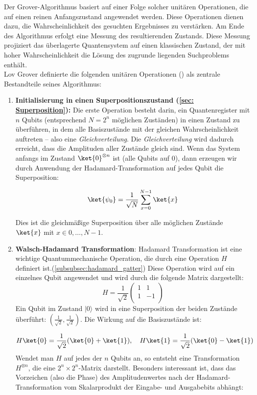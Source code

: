 {Der Grover-Algorithmus basiert auf einer Folge solcher unitären Operationen, die auf einen reinen Anfangszustand angewendet werden. Diese Operationen dienen dazu, die Wahrscheinlichkeit des gesuchten Ergebnisses zu verstärken. Am Ende des Algorithmus erfolgt eine Messung des resultierenden Zustands. Diese Messung projiziert das überlagerte Quantensystem auf einen klassischen Zustand, der mit hoher Wahrscheinlichkeit die Lösung des zugrunde liegenden Suchproblems enthält.\\

Lov Grover definierte die folgenden unitären Operationen (\cite{zotero-1211}) als zentrale Bestandteile seines Algorithmus:

\begin{enumerate}
    \item \textbf{Initialisierung in einen Superpositionszustand (\ref{sec: Superposition}):} 
    Die erste Operation besteht darin, ein Quantenregister mit $n$ Qubits (entsprechend $N = 2^{n}$ möglichen Zuständen) in einen Zustand zu überführen, in dem alle Basiszustände mit der gleichen Wahrscheinlichkeit auftreten – also eine \textit{Gleichverteilung}. Die \textit{Gleichverteilung} wird dadurch erreicht, dass die Amplituden aller Zustände gleich sind. Wenn das System anfangs im Zustand $\ket{0}^{\otimes n}$ ist (alle Qubits auf 0), dann erzeugen wir durch Anwendung der Hadamard-Transformation auf jedes Qubit die Superposition:

$$
\ket{\psi_0} = \frac{1}{\sqrt{N}} \sum_{x=0}^{N-1} \ket{x}
$$

Dies ist die gleichmäßige Superposition über alle möglichen Zustände $\ket{x}$ mit $x \in {0, \ldots, N-1}$.\\
    \item \textbf{Walsch-Hadamard Transformation}: Hadamard Transformation ist eine wichtige Quantummechanische Operation, die durch eine Operation $H$ definiert ist.(\ref{subsubsec:hadamard_gatter}) Diese Operation wird auf ein einzelnes Qubit angewendet und wird durch die folgende Matrix dargestellt:
    $$
H = \frac{1}{\sqrt{2}} \begin{pmatrix}
1 & 1 \\
1 & -1 \\
\end{pmatrix}
$$
Ein Qubit im Zustand \( \lvert 0 \rangle \) wird in eine Superposition der beiden Zustände überführt: \( \left( \frac{1}{\sqrt{2}}, \frac{1}{\sqrt{2}} \right) \). Die Wirkung auf die Basiszustände ist:

$$
H\ket{0} = \frac{1}{\sqrt{2}}(\ket{0} + \ket{1}), \quad H\ket{1} = \frac{1}{\sqrt{2}}(\ket{0} - \ket{1})
$$
Wendet man $H$ auf jedes der $n$ Qubits an, so entsteht eine Transformation $H^{\otimes n}$, die eine $2^n \times 2^n$-Matrix darstellt.
Besonders interessant ist, dass das Vorzeichen (also die Phase) des Amplitudenwertes nach der Hadamard-Transformation vom Skalarprodukt der Eingabe- und Ausgabebits abhängt:


\end{enumerate}}

